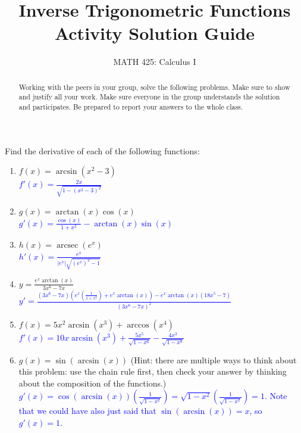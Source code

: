 \documentclass{ximera}
\title{Inverse Trigonometric Functions Activity Solution Guide}
\author{MATH 425: Calculus I}
\begin{document}
\begin{abstract}
    Working with the peers in your group, solve the following problems. Make sure to show and justify all your work. Make sure everyone in the group understands the solution and participates. Be prepared to report your answers to the whole class. 
\end{abstract}
\maketitle


\begin{exercise}
    Find the derivative of each of the following functions:
    \begin{enumerate}
        \item $f(x)=\arcsin(x^2-3)$\\
        \textcolor{blue}{$f'(x)=\frac{2x}{\sqrt{1-(x^2-3)^2}}$}
         \item $g(x)=\arctan(x)\cos(x)$\\
         \textcolor{blue}{$g'(x)=\frac{\cos(x)}{1+x^2}-\arctan(x)\sin(x)$}
         \item $h(x)=\operatorname{arcsec}(e^x)$\\
         \textcolor{blue}{$h'(x)=\frac{e^x}{|e^x|\sqrt{(e^x)^2-1}}$}
         \item $y=\frac{e^x\arctan(x)}{3x^6-7x}$\\
         \textcolor{blue}{$y'=\frac{(3x^6-7x)\left(e^x\left(\frac{1}{1+x^2}\right)+e^x\arctan(x)\right)-e^x\arctan(x)(18x^5-7)}{(3x^6-7x)^2}$}
         \item $f(x)=5x^2\arcsin(x^3)+\arccos(x^4)$\\
         \textcolor{blue}{$f'(x)=10x\arcsin(x^3)+\frac{5x^5}{\sqrt{1-x^6}}-\frac{4x^3}{\sqrt{1-x^8}}$}
         \item $g(x)=\sin(\arcsin(x))$ (Hint: there are multiple ways to think about this problem: use the chain rule first, then check your answer by thinking about the composition of the functions.)\\
         \textcolor{blue}{$g'(x)=\cos(\arcsin(x))(\frac{1}{\sqrt{1-x^2}})=\sqrt{1-x^2}(\frac{1}{\sqrt{1-x^2}})=1$.  Note that we could have also just said that $\sin(\arcsin(x))=x$, so $g'(x)=1$.}
    \end{enumerate}
\end{exercise}
\end{document}
